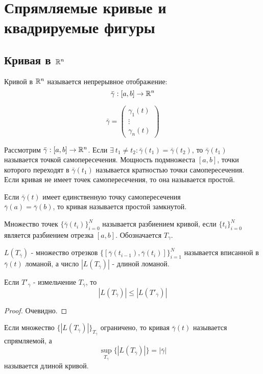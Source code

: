 \section{Спрямляемые кривые и квадрируемые фигуры}
\subsection{Кривая в \texorpdfstring{$\mathbb{R}^n$}{Rn}}

\begin{definition}
    Кривой в $\mathbb{R}^n$ называется непрерывное отображение:
    \[\bar{\gamma}: [a,b]\to \mathbb{R}^n\]
\end{definition} 
\begin{comm}
    \[\bar{\gamma}=\begin{pmatrix}
       \gamma_1(t)\\
       \vdots\\
       \gamma_n(t) 
    \end{pmatrix}\]
\end{comm} 
\begin{definition}
    Рассмотрим $\bar{\gamma}: [a,b]\to \mathbb{R}^n$. Если $\exists\ t_1\ne t_2: \bar{\gamma}(t_1)=\bar{\gamma}(t_2)$, то $\bar{\gamma}(t_1)$ называется точкой самопересечения. Мощность подмножеста $[a,b]$, точки которого переходят в $\bar{\gamma}(t_1)$ называется кратностью точки самопересечения. Если кривая не имеет точек самопересечения, то она называется простой.
\end{definition} 
\begin{definition}
    Если $\bar{\gamma}(t)$ имеет единственную точку самопересечения\\
    $\bar{\gamma}(a)=\bar{\gamma}(b)$, то кривая называется простой замкнутой.
\end{definition} 
\begin{definition}
    Множество точек $\{\bar{\gamma}(t_i)\}_{i=0}^N$ называется разбиением кривой, если $\{t_i\}_{i=0}^N$ является разбиением отрезка $[a,b]$. Обозначается $T_{\gamma}$.
\end{definition} 
\begin{definition}
    $L(T_{\bar{\gamma}})$ - множество отрезков $\{[\bar{\gamma}(t_{i-1}),\bar{\gamma}(t_i)]\}_{i=1}^N$ называется вписанной в $\bar{\gamma}(t)$ ломаной, а число $|L(T_{\bar{\gamma}})|$ - длиной ломаной.
\end{definition} 
\begin{statement}
    Если $T'_{\bar{\gamma}}$ - измельчение $T_{\bar{\gamma}}$, то 
    \[|L(T_{\bar{\gamma}})|\leq |L(T'_{\bar{\gamma}})|\]
\end{statement} 
\begin{proof}
    Очевидно.
\end{proof} 
\begin{definition}
    Если множество $\{|L(T_{\bar{\gamma}})|\}_{T_{\bar{\gamma}}}$ ограничено, то кривая $\bar{\gamma}(t)$ называется спрямляемой, а
    \[\sup\limits_{T_{\bar{\gamma}}}\{|L(T_{\bar{\gamma}})|\}=|\bar{\gamma}|\]
    называется длиной кривой.
\end{definition} 